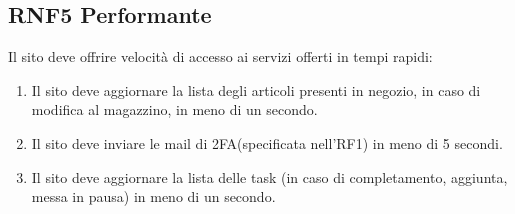 \documentclass{report}
\begin{document}
\subsection*{RNF5 Performante}
Il sito deve offrire velocità di accesso ai servizi offerti in tempi rapidi:
\begin{enumerate}
	\item Il sito deve aggiornare la lista degli articoli presenti in negozio, in caso di modifica al magazzino, in meno di un secondo.
	\item Il sito deve inviare le mail di 2FA(specificata nell'RF1) in meno di 5 secondi.
	\item Il sito deve aggiornare la lista delle task (in caso di completamento, aggiunta, messa in pausa) in meno di un secondo.
\end{enumerate}
\end{document}

